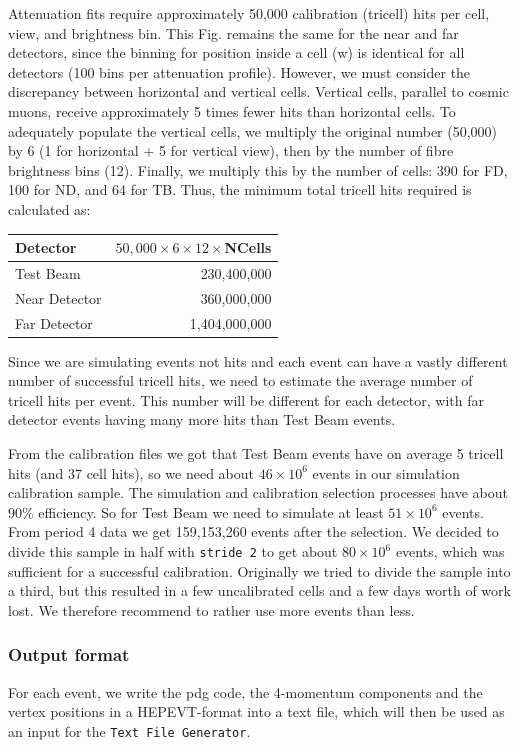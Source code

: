 Attenuation fits require approximately 50,000 calibration (tricell) hits per cell, view, and brightness bin. This Fig. remains the same for the near and far detectors, since the binning for position inside a cell (w) is identical for all detectors (100 bins per attenuation profile). However, we must consider the discrepancy between horizontal and vertical cells. Vertical cells, parallel to cosmic muons, receive approximately 5 times fewer hits than horizontal cells. To adequately populate the vertical cells, we multiply the original number (50,000) by 6 (1 for horizontal + 5 for vertical view), then by the number of fibre brightness bins (12). Finally, we multiply this by the number of cells: 390 for FD, 100 for ND, and 64 for TB. Thus, the minimum total tricell hits required is calculated as:
\begin{center}
\begin{tabular}{lr}
Detector & $50,000\times 6\times 12\times$NCells\\\hline
Test Beam & 230,400,000\\
Near Detector & 360,000,000\\
Far Detector & 1,404,000,000
\end{tabular}
\end{center}

Since we are simulating events not hits and each event can have a vastly different number of successful tricell hits, we need to estimate the average number of tricell hits per event. This number will be different for each detector, with far detector events having many more hits than Test Beam events.

From the calibration files we got that Test Beam events have on average 5 tricell hits (and 37 cell hits), so we need about $46\times10^6$ events in our simulation calibration sample. The simulation and calibration selection processes have about 90\% efficiency. So for Test Beam we need to simulate at least $51\times10^6$ events. From period 4 data we get 159,153,260 events after the selection. We decided to divide this sample in half with \texttt{stride 2} to get about $80\times10^6$ events, which was sufficient for a successful calibration. Originally we tried to divide the sample into a third, but this resulted in a few uncalibrated cells and a few days worth of work lost. We therefore recommend to rather use more events than less.

\subsubsection*{Output format}\label{secHEPEVTFormat}
For each event, we write the pdg code, the 4-momentum components and the vertex positions in a HEPEVT-format \cite{HEPEVTFormat} into a text file, which will then be used as an input for the \texttt{Text File Generator}.

